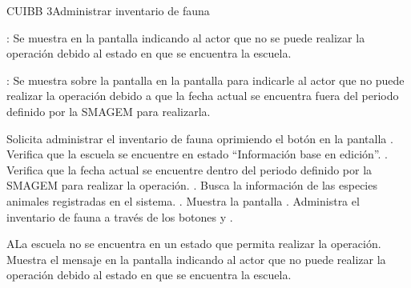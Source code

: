 \begin{UseCase}{CUIBB 3}{Administrar inventario de fauna}
{\begin{UClist}
	    \UCli {}: Se muestra en la pantalla  indicando al actor que no se puede realizar la operación debido al estado en que se encuentra la escuela.
	    
	    \UCli {}: Se muestra sobre la pantalla en la pantalla  para indicarle al actor que no puede realizar la operación debido a que la fecha actual se encuentra fuera del periodo definido por la SMAGEM para realizarla.
	    
	\end{UClist}
    }


\end{UseCase}

 \begin{UCtrayectoria}
    \UCpaso[\UCactor] Solicita administrar el inventario de fauna oprimiendo el botón \botReg en la pantalla .
    \UCpaso[\UCsist] Verifica que la escuela se encuentre en estado ``Información base en edición''. .
    \UCpaso[\UCsist] Verifica que la fecha actual se encuentre dentro del periodo definido por la SMAGEM para realizar la operación. .
    \UCpaso[\UCsist] Busca la información de las especies animales registradas en el sistema. .
    \UCpaso[\UCsist] Muestra la pantalla .
    \UCpaso[\UCactor] Administra el inventario de fauna a través de los botones y \botKo  . \label{cuibb3:Registrar}
 \end{UCtrayectoria}
 
 \begin{UCtrayectoriaA}{A}{La escuela no se encuentra en un estado que permita realizar la operación.}
    \UCpaso[\UCsist] Muestra el mensaje  en la pantalla  indicando al actor que no puede realizar la operación debido al estado en que se encuentra la escuela.
 \end{UCtrayectoriaA}
 
